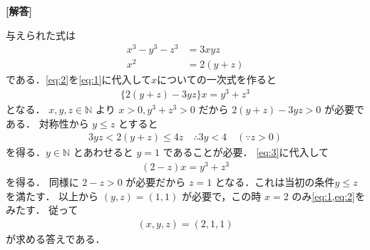 \documentclass[../../main.tex]{subfiles}
\begin{document}
\begin{oframed}
  
\end{oframed}

{\bf [解答]}

与えられた式は
\begin{align}
  x^3 - y^3 - z^3 &= 3xyz \label{eq:1} \\
  x^2 &= 2(y + z) \label{eq:2}
\end{align}
である．\cref{eq:2}を\cref{eq:1}に代入して$x$についての一次式を作ると
\begin{align}
  \{ 2(y+z) - 3yz \} x = y^3 + z^3 \label{eq:3}
\end{align}
となる．
$x, y, z \in \mathbb{N}$ より $x > 0, y^3 + z^3 > 0$ だから $2(y+z) - 3yz > 0$ が必要である．
対称性から $y \le z$ とすると
\begin{align}
  3yz < 2(y+z) \le 4z \quad \therefore 3y < 4 \quad (\because z > 0)
\end{align}
を得る．$y \in \mathbb{N}$ とあわせると $y = 1$ であることが必要．
\cref{eq:3}に代入して
\begin{align}
  (2-z)x = y^3 + z^3
\end{align}
を得る．
同様に $2-z > 0$ が必要だから $z = 1$ となる．これは当初の条件$y \le z$を満たす．
以上から $(y, z) = (1, 1)$ が必要で，この時 $x = 2$ のみ\cref{eq:1,eq:2}をみたす．
従って
\begin{align}
  (x, y, z) = (2, 1, 1)
\end{align}
が求める答えである．

\newpage
\end{document}
